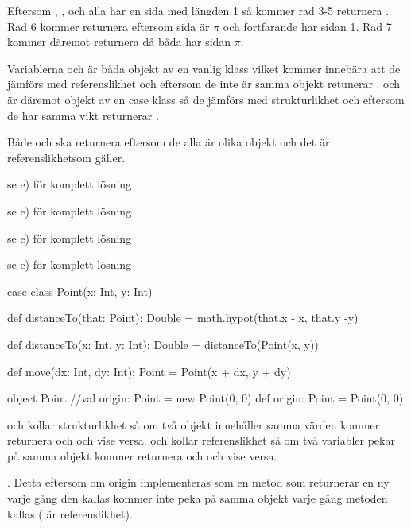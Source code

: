 Eftersom , ,  och  alla har en sida med längden 1 så kommer rad 3-5 returnera . Rad 6 kommer returnera  eftersom  sida är $\pi$ och  fortfarande har sidan 1. Rad 7 kommer däremot returnera  då båda har sidan $\pi$.

\Task %

\Subtask Variablerna  och  är båda objekt av en vanlig klass vilket kommer innebära att de jämförs med referenslikhet och eftersom de inte är samma objekt retunerar \code{==} .  och  är däremot objekt av en case klass så de jämförs med strukturlikhet och eftersom de har samma vikt returnerar \code{==} .

\Subtask Både  och  ska returnera  eftersom de alla är olika objekt och det är referenslikhetsom gäller.

\Task %

\Subtask se e) för komplett lösning

\Subtask se e) för komplett lösning

\Subtask se e) för komplett lösning

\Subtask se e) för komplett lösning

\Subtask \begin{CodeSmall}
case class Point(x: Int, y: Int) {

	def distanceTo(that: Point): Double = math.hypot(that.x - x, that.y -y)

	def distanceTo(x: Int, y: Int): Double = distanceTo(Point(x, y))

	def move(dx: Int, dy: Int): Point = Point(x + dx, y + dy)
}

object Point {
	//val origin: Point = new Point(0, 0)
	def origin: Point = Point(0, 0)
}
\end{CodeSmall}

\Subtask \code{==} och \code{!=} kollar strukturlikhet så om två objekt innehåller samma värden kommer \code{==} returnera  och \code{!=}  och vise versa.  och  kollar referenslikhet så om två variabler pekar på samma objekt kommer  returnera  och   och vise versa.

\Subtask {}. Detta eftersom om origin implementeras som en metod som returnerar en ny  varje gång den kallas kommer  inte peka på samma objekt varje gång metoden kallas ( är referenslikhet).

